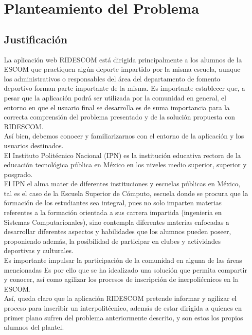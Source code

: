 \chapter{Planteamiento del Problema}

\section{Justificaci\'on}

La aplicación web RIDESCOM está dirigida principalmente a los alumnos de la ESCOM que practiquen algún deporte impartido por la misma escuela, aunque los administrativos o responsables del área del departamento de fomento deportivo forman parte importante de la misma. Es importante establecer que, a pesar que la aplicación podrá ser utilizada por la comunidad en general,  el entorno en que el usuario final se desarrolla es de suma importancia para la correcta comprensión del problema presentado y de la solución propuesta con RIDESCOM.\\ 
Así bien, debemos conocer y familiarizarnos con el entorno de la aplicación y los usuarios destinados. \\
El Instituto Politécnico Nacional (IPN) es la institución educativa rectora de la educación tecnológica pública en México en los niveles medio superior, superior y posgrado. \cite{hist} \\

El IPN el alma mater de diferentes instituciones y escuelas públicas en México, tal es el caso de la Escuela Superior de Cómputo, escuela donde se procura que la formación de los estudiantes sea integral, pues no solo imparten materias referentes a la formación orientada a sus carrera impartida (ingeniería en Sistemas Computacionales), sino contempla diferentes materias enfocadas a desarrollar diferentes aspectos y habilidades que los alumnos pueden poseer, proponiendo además, la posibilidad de participar en clubes y actividades deportivas y culturales. \\ 
Es importante impulsar la participación de la comunidad en alguna de las áreas mencionadas 
Es por ello que se ha idealizado una solución que permita compartir y conocer, así como agilizar los procesos de inscripción de inerpoliécnicos en la ESCOM.\\ %
Así, queda claro que la aplicación RIDESCOM pretende informar y agilizar el proceso para inscribir un interpolitécnico, además de estar dirigida a quienes en primer plano sufren del problema anteriormente descrito, y son estos los propios alumnos del plantel.


